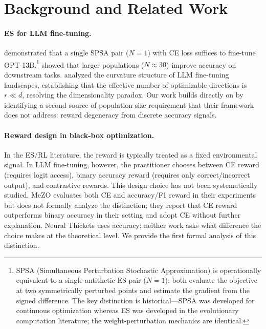 \documentclass[11pt]{article}
\theoremstyle{definition}
\theoremstyle{remark}
\begin{document}
\section{Background and Related Work}
\label{sec:background}

\paragraph{ES for LLM fine-tuning.}
\citet{malladi2023mezo} demonstrated that a single SPSA pair ($N=1$) with CE loss suffices to fine-tune OPT-13B.\footnote{SPSA (Simultaneous Perturbation Stochastic Approximation) is operationally equivalent to a single antithetic ES pair ($N=1$): both evaluate the objective at two symmetrically perturbed points and estimate the gradient from the signed difference. The key distinction is historical---SPSA was developed for continuous optimization whereas ES was developed in the evolutionary computation literature; the weight-perturbation mechanics are identical.} \citet{qiu2025esscale} showed that larger populations ($N \approx 30$) improve accuracy on downstream tasks. \citet{liang2026blessing} analyzed the curvature structure of LLM fine-tuning landscapes, establishing that the effective number of optimizable directions is $r \ll d$, resolving the dimensionality paradox. Our work builds directly on \citet{liang2026blessing} by identifying a second source of population-size requirement that their framework does not address: reward degeneracy from discrete accuracy signals.

\paragraph{Reward design in black-box optimization.}
In the ES/RL literature, the reward is typically treated as a fixed environmental signal. In LLM fine-tuning, however, the practitioner chooses between CE reward (requires logit access), binary accuracy reward (requires only correct/incorrect output), and contrastive rewards. This design choice has not been systematically studied. MeZO \citep{malladi2023mezo} evaluates both CE and accuracy/F1 reward in their experiments but does not formally analyze the distinction; they report that CE reward outperforms binary accuracy in their setting and adopt CE without further explanation. Neural Thickets \citep{gan2026thickets} uses accuracy; neither work asks what difference the choice makes at the theoretical level. We provide the first formal analysis of this distinction.
\end{document}
